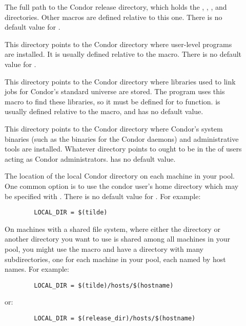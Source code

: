 \begin{description}
\item[] \label{param:ReleaseDir} The full path to
  the Condor release directory, which holds the ,
  , , and  directories.  Other macros
  are defined relative to this one.  There is no default value for
  .

\item[] \label{param:Bin} This directory points to the
  Condor directory where user-level programs are installed.  It is
  usually defined relative to the  macro.
  There is no default value for .
  
\item[] \label{param:Lib} This directory points to the
  Condor directory where libraries used to link jobs for Condor's
  standard universe are stored.  The  program uses
  this macro to find these libraries, so it must be defined for
   to function.   is usually defined
  relative to the  macro, and has no default
  value.

\item[] \label{param:Sbin} This directory points to the
  Condor directory where Condor's system binaries (such as the
  binaries for the Condor daemons) and administrative tools are
  installed.  Whatever directory  points to ought
  to be in the  of users acting as Condor
  administrators.   has no default value.

\item[] \label{param:LocalDir} The location of the
  local Condor directory on each machine in your pool.  One common
  option is to use the condor user's home directory which may be
  specified with .  There is no default value for
  .  For example:
\begin{verbatim}
        LOCAL_DIR = $(tilde)
\end{verbatim}
  
  On machines with a shared file system, where either the
   directory or another directory you want to use is
  shared among all machines in your pool, you might use the
   macro and have a directory with many
  subdirectories, one for each machine in your pool, each named by
  host names.  For example:
\begin{verbatim}
        LOCAL_DIR = $(tilde)/hosts/$(hostname)      
\end{verbatim}
  or:
\begin{verbatim}
        LOCAL_DIR = $(release_dir)/hosts/$(hostname)
\end{verbatim}
  

\end{description}
